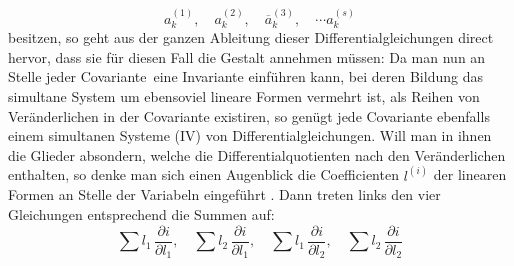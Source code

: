 \[
a_k^{(1)},\quad a_k^{(2)},\quad \overline{a}_k^{(3)},\quad \cdots a_k^{(s)}
\]
besitzen, so geht aus der ganzen Ableitung dieser Differentialgleichungen
 direct hervor, dass sie für diesen Fall die Gestalt annehmen
 müssen:
Da man nun an Stelle jeder Covariante\footnotemark\ eine Invariante einführen
kann, bei deren Bildung das simultane System um ebensoviel lineare
Formen vermehrt ist, als Reihen von Veränderlichen in der Covariante
existiren, so genügt jede Covariante ebenfalls einem simultanen
Systeme (IV) von Differentialgleichungen. Will man in ihnen die
Glieder absondern, welche die Differentialquotienten nach den Veränderlichen
 enthalten, so denke man sich einen Augenblick die
Coefficienten $l^{(i)}$ der linearen Formen an Stelle der Variabeln eingeführt
. Dann treten links den vier Gleichungen entsprechend die
Summen auf:
\[
\sum l_1\,\frac{\partial i}{\partial l_1},\quad \sum l_2\,\frac{\partial i}{\partial l_1},\quad \sum l_1\,\frac{\partial i}{\partial l_2},\quad \sum l_2\,\frac{\partial i}{\partial l_2}
\]
